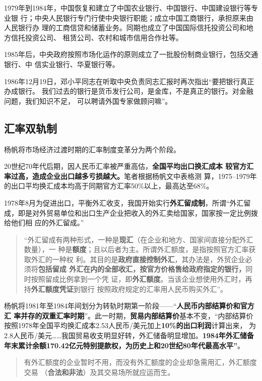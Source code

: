1979年到1984年，中国恢复和建立了中国农业银行、中国银行、中国建设银行等专业银
行；中央人民银行专门行使中央银行职能；成立中国工商银行，承担原来由人民银行办
理的工商信贷和储蓄业务。同期也成立了中国国际信托投资公司和地方信托投资公司、
租赁公司、农村和城市信用合作社等。

1985年后，中央政府按照市场化运作的原则成立了一批股份制商业银行，包括交通银行、中
信实业银行、华夏银行等。

1986年12月19日，邓小平同志在听取中央负责同志汇报时再次指出“要把银行真正办成银行。
我们过去的银行是货币发行公司，是金库，不是真正的银行。对金融问题，我们知识不足，
可以聘请外国专家做顾问嘛”。


\subsection{汇率双轨制}

杨帆将市场经济过渡时期的汇率制度变革分为两个阶段。\cite{huilvshi}

20世纪70年代后期，因人民币汇率被严重高估，\textbf{全国平均出口换汇成本
  较官方汇率过高，造成企业出口越多亏损越大。}笔者根据杨帆文中表格测
算，1975--1979年的出口平均换汇成本均高于同期官方汇率50\%以上，最高达至68\%。

1978年8月为促进出口，平衡外汇收支，我国开始实行\textbf{外汇留成制}，所谓“外汇留
成，即是对外贸易单位和出口生产企业把收入的外汇卖给国家，国家按一定比例拨给他们相
应的外汇留成。”

\begin{quotation}
  “外汇留成有两种形式，一种是\textbf{现汇}（在企业和地方、国家间直接分配外汇数量），一
  种是\textbf{额度}；且以后者为主。所谓外汇额度，是指按照官方汇率获取外汇的一种权
  利。其目的是\textbf{政府直接控制外汇}，其办法是，外贸企业必须将\textbf{包括留成
    外汇在内的全部收汇，按官方价格售给政府指定的银行，}同时按照留成比例拿到一个凭
  证，即\textbf{外汇额度}。当该企业想使用外汇时，再持\textbf{外汇额度凭证}到银行
  按照政府规定的汇率用人民币购买外汇”。
\end{quotation}


杨帆将1981年至1984年间划分为转轨时期第一阶段——“\textbf{人民币内部结算价和官方汇
  率并存的双重汇率时期}”。此一时期，\textbf{贸易内部结算价}基本不变，“内部结算价
按照1978年全国平均换汇成本2.53人民币/美元加上\textbf{10\%的出口利润}计算出来，
为2.8人民币/美元……我国贸易收支明显好转，外汇储备明显增加。\textbf{1984年外汇储备
  年末累计余额170.42亿元特别提款权，为历史上和20世纪80年代最高水平”}。

\begin{quotation}
  有外汇额度的企业暂时不用，而没有外汇额度的企业却急需用汇，外汇额度交易
  （\textbf{合法和非法}）及其交易场所就应运而生。
\end{quotation}


